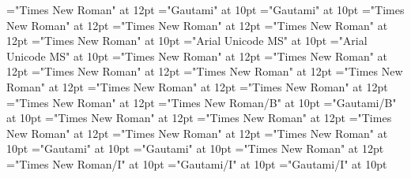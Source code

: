 \documentclass[a4paper,twoside]{article}
\begin{document}
 
\pagestyle{plain} 
\font\spanenentryletDatadicBody="Times New Roman" at 12pt
\font\spantexitemtespanentranslationsexamplessensesensesentryletDatadicBody="Gautami" at 10pt
\font\xitemtespanentranslationsexamplessensesensesentryletDatadicBody="Gautami" at 10pt
\font\spanenspanenspanentranslationsexamplessensesensesentryletDatadicBody="Times New Roman" at 12pt
\font\spanenspanentranslationsexamplessensesensesentryletDatadicBody="Times New Roman" at 12pt
\font\spanentranslationsexamplessensesensesentryletDatadicBody="Times New Roman" at 12pt
\font\spanenLexSensepublishStemGlossPubLesensesensesentryletDatadicBody="Times New Roman" at 10pt
\font\spanhiLexSensepublishStemGlossPubLesensesensesentryletDatadicBody="Arial Unicode MS" at 10pt
\font\LexSensepublishStemGlossPubLesensesensesentryletDatadicBody="Arial Unicode MS" at 10pt
\font\spanenspanenpictureCaptionpictureRightentryletDatadicBody="Times New Roman" at 12pt
\font\spanenpictureCaptionpictureRightentryletDatadicBody="Times New Roman" at 12pt
\font\spanenCmPicturepublishStemPileThumbnailPubpictureCaptionpictureRightentryletDatadicBody="Times New Roman" at 12pt
\font\CmPicturepublishStemPileThumbnailPubpictureCaptionpictureRightentryletDatadicBody="Times New Roman" at 12pt
\font\pictureCaptionpictureRightentryletDatadicBody="Times New Roman" at 12pt
\font\picturepictureRightentryletDatadicBody="Times New Roman" at 12pt
\font\pictureRightentryletDatadicBody="Times New Roman" at 12pt
\font\spanencomplexformrefsentryletDatadicBody="Times New Roman" at 12pt
\font\spanencomplexformformcomplexformrefsentryletDatadicBody="Times New Roman/B" at 10pt
\font\complexformformcomplexformrefsentryletDatadicBody="Gautami/B" at 10pt
\font\spanenspanencomplexformtypecomplexformrefsentryletDatadicBody="Times New Roman" at 12pt
\font\spanencomplexformtypecomplexformrefsentryletDatadicBody="Times New Roman" at 12pt
\font\complexformtypecomplexformrefsentryletDatadicBody="Times New Roman" at 12pt
\font\complexformrefsentryletDatadicBody="Times New Roman" at 12pt
\font\spanentranslationLdtranslationsexamplessensesensesentryletDatadicBody="Times New Roman" at 10pt
\font\spantetranslationLdtranslationsexamplessensesensesentryletDatadicBody="Gautami" at 10pt
\font\translationLdtranslationsexamplessensesensesentryletDatadicBody="Gautami" at 10pt
\font\translationsexamplessensesensesentryletDatadicBody="Times New Roman" at 12pt
\font\spanenexampleexamplessensesensesentryletDatadicBody="Times New Roman/I" at 10pt
\font\spanggoTeluINexampleexamplessensesensesentryletDatadicBody="Gautami/I" at 10pt
\font\exampleexamplessensesensesentryletDatadicBody="Gautami/I" at 10pt
\end{document}
